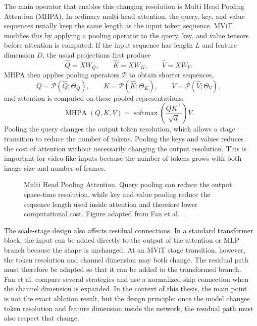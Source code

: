 The main operator that enables this changing resolution is Multi Head Pooling Attention (MHPA). In ordinary multi-head attention, the query, key, and value sequences usually keep the same length as the input token sequence. MViT modifies this by applying a pooling operator to the query, key, and value tensors before attention is computed. If the input sequence has length $L$ and feature dimension $D$, the usual projections first produce
\begin{equation}
\hat{Q}=XW_Q,\qquad \hat{K}=XW_K,\qquad \hat{V}=XW_V .
\end{equation}
MHPA then applies pooling operators $\mathcal{P}$ to obtain shorter sequences,
\begin{equation}
Q=\mathcal{P}(\hat{Q};\Theta_Q),\qquad
K=\mathcal{P}(\hat{K};\Theta_K),\qquad
V=\mathcal{P}(\hat{V};\Theta_V),
\end{equation}
and attention is computed on these pooled representations:
\begin{equation}
\operatorname{MHPA}(Q,K,V)
= \operatorname{softmax}\left(\frac{QK^\top}{\sqrt{d}}\right)V .
\end{equation}
Pooling the query changes the output token resolution, which allows a stage transition to reduce the number of tokens. Pooling the keys and values reduces the cost of attention without necessarily changing the output resolution. This is important for video-like inputs because the number of tokens grows with both image size and number of frames.

\begin{figure}[H]
\centering
{}
\caption{Multi Head Pooling Attention. Query pooling can reduce the output space-time resolution, while key and value pooling reduce the sequence length used inside attention and therefore lower computational cost. Figure adapted from Fan et al.~\cite{ref_mvit}.}
\label{fig:intro_mvit_mhpa}
\end{figure}

The scale-stage design also affects residual connections. In a standard transformer block, the input can be added directly to the output of the attention or MLP branch because the shape is unchanged. At an MViT stage transition, however, the token resolution and channel dimension may both change. The residual path must therefore be adapted so that it can be added to the transformed branch. Fan et al. compare several strategies and use a normalized skip connection when the channel dimension is expanded. In the context of this thesis, the main point is not the exact ablation result, but the design principle: once the model changes token resolution and feature dimension inside the network, the residual path must also respect that change.

